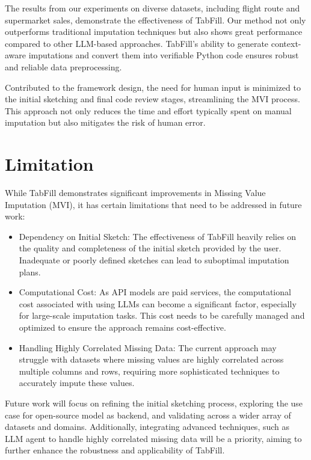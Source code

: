 \documentclass[sigconf]{acmart}
\begin{document}
The results from our experiments on diverse datasets, including flight route and supermarket sales, demonstrate the effectiveness of TabFill. Our method not only outperforms traditional imputation techniques but also shows great performance compared to other LLM-based approaches. TabFill’s ability to generate context-aware imputations and convert them into verifiable Python code ensures robust and reliable data preprocessing.

Contributed to the framework design, the need for human input is minimized to the initial sketching and final code review stages, streamlining the MVI process. This approach not only reduces the time and effort typically spent on manual imputation but also mitigates the risk of human error. 


\section{Limitation}
While TabFill demonstrates significant improvements in Missing Value Imputation (MVI), it has certain limitations that need to be addressed in future work:
\begin{itemize}
  \item Dependency on Initial Sketch: The effectiveness of TabFill heavily relies on the quality and completeness of the initial sketch provided by the user. Inadequate or poorly defined sketches can lead to suboptimal imputation plans.
  
  \item Computational Cost: As API models are paid services, the computational cost associated with using LLMs can become a significant factor, especially for large-scale imputation tasks. This cost needs to be carefully managed and optimized to ensure the approach remains cost-effective.
  
  \item Handling Highly Correlated Missing Data: The current approach may struggle with datasets where missing values are highly correlated across multiple columns and rows, requiring more sophisticated techniques to accurately impute these values.
\end{itemize}

Future work will focus on refining the initial sketching process, exploring the use case for open-source model as backend, and validating across a wider array of datasets and domains. Additionally, integrating advanced techniques, such as LLM agent to handle highly correlated missing data will be a priority, aiming to further enhance the robustness and applicability of TabFill.
\end{document}
